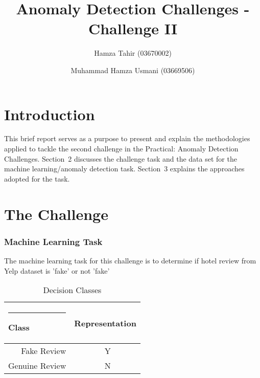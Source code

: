\documentclass{llncs}
\begin{document}
%
\frontmatter          %
%
\pagestyle{headings}  %

\mainmatter              %
%
\title{Anomaly Detection Challenges - Challenge II}
%

%
\author{Hamza Tahir (03670002) \and Muhammad Hamza Usmani (03669506)}
%
%

\maketitle              %


%
\section{Introduction}
%
This brief report serves as a purpose to present and explain the methodologies applied to tackle the second challenge in the Practical: Anomaly Detection Challenges. Section~2 discusses the challenge task and the data set for the machine learning/anomaly detection task. Section~3 explains the approaches adopted for the task.
%
\section{The Challenge}
%
%
\subsubsection{Machine Learning Task}
%
The machine learning task for this challenge is to determine if hotel review from Yelp dataset is 'fake' or not 'fake'
\begin{table}
\caption{Decision Classes}
\begin{center}
\begin{tabular}{r@{\quad}rl}
\hline
\multicolumn{1}{l}{\rule{2pt}{0pt}
Class}&\multicolumn{2}{l}{Representation}\\[2pt]
\hline\rule{0pt}{12pt}
Fake Review&    Y& \\
Genuine Review&     N& \\[2pt]
\hline
\end{tabular}
\end{center}
\end{table}
%
\end{document}
